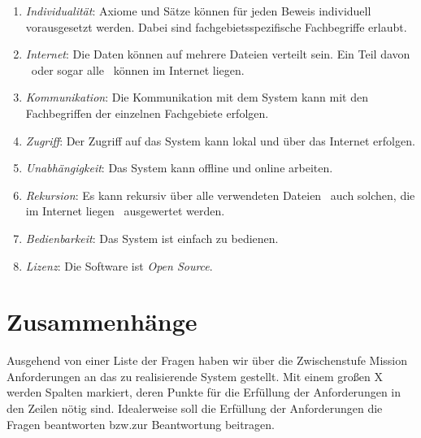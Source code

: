 \documentclass[english,ngerman,parskip=half,headsepline,footsepline]{scrreprt}
\begin{document}
\begin{enumerate}
		\item \label{Ziel:Individualität} \emph{Individualität}: Axiome und Sätze können für jeden Beweis individuell vorausgesetzt werden. Dabei sind fachgebietsspezifische Fachbegriffe erlaubt.
		
		\item \label{Ziel:Internet} \emph{Internet}: Die Daten können auf mehrere Dateien verteilt sein. Ein Teil davon \textendash\ oder sogar alle \textendash\ können im Internet liegen.
		
		\item \label{Ziel:Kommunikation} \emph{Kommunikation}: Die Kommunikation mit dem System kann mit den Fachbegriffen der einzelnen Fachgebiete erfolgen.
		
		\item \label{Ziel:Zugriff} \emph{Zugriff}: Der Zugriff auf das System kann lokal und über das Internet erfolgen.
		
		\item \label{Ziel:Unabhängigkeit} \emph{Unabhängigkeit}: Das System kann offline und online arbeiten.
		
		\item \label{Ziel:Rekursion} \emph{Rekursion}: Es kann rekursiv über alle verwendeten Dateien \textendash\ auch solchen, die im Internet liegen \textendash\ ausgewertet werden.
		
		\item \label{Ziel:Bedienbarkeit} \emph{Bedienbarkeit}: Das System ist einfach zu bedienen.
		
		\item \label{Ziel:Lizenz} \emph{Lizenz}: Die Software ist \emph{Open Source}.
		
	\end{enumerate}
	
	\section{Zusammenhänge}
    \label{sec:Zusammenhänge}

	Ausgehend von einer Liste der Fragen haben wir über die Zwischenstufe Mission Anforderungen an das zu realisierende System gestellt. Mit einem großen X werden Spalten markiert, deren Punkte für die Erfüllung der Anforderungen in den Zeilen nötig sind. Idealerweise soll die Erfüllung der Anforderungen die Fragen beantworten bzw.\@ zur Beantwortung beitragen.\vspace{12pt}
	
\end{document}
